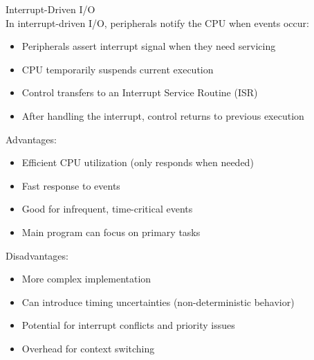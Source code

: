 \begin{concept}{Interrupt-Driven I/O}\\
In interrupt-driven I/O, peripherals notify the CPU when events occur:
\begin{itemize}
    \item Peripherals assert interrupt signal when they need servicing
    \item CPU temporarily suspends current execution
    \item Control transfers to an Interrupt Service Routine (ISR)
    \item After handling the interrupt, control returns to previous execution
\end{itemize}

Advantages:
\begin{itemize}
    \item Efficient CPU utilization (only responds when needed)
    \item Fast response to events
    \item Good for infrequent, time-critical events
    \item Main program can focus on primary tasks
\end{itemize}

Disadvantages:
\begin{itemize}
    \item More complex implementation
    \item Can introduce timing uncertainties (non-deterministic behavior)
    \item Potential for interrupt conflicts and priority issues
    \item Overhead for context switching
\end{itemize}
\end{concept}

